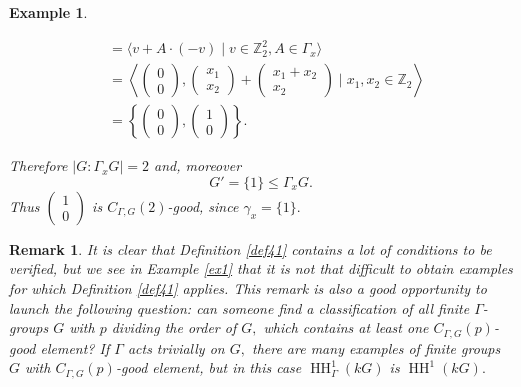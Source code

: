 \documentclass[pdflatex,sn-mathphys-num]{sn-jnl}
\numberwithin{equation}{section}
\theoremstyle{thmstyleone}
\theoremstyle{thmstyletwo}
\newtheorem{example}{Example}
\newtheorem{remark}{Remark}
\theoremstyle{thmstylethree}
\newcommand{\HH}{\operatorname{HH}}
\begin{document}
\begin{example}
\begin{itemize}
\begin{align*}
[G,\Gamma_x]
&=\langle v+A\cdot(-v)\mid v\in \mathbb{Z}_2^2,A\in \Gamma_x\rangle \\
&=\left\langle \begin{pmatrix}0 \\ 0\end{pmatrix},\begin{pmatrix}x_1 \\ x_2\end{pmatrix}+\begin{pmatrix}x_1+x_2 \\ x_2\end{pmatrix}\mid x_1,x_2\in \mathbb{Z}_2\right\rangle \\
&=\left\{\begin{pmatrix}0 \\ 0\end{pmatrix},\begin{pmatrix}1 \\ 0\end{pmatrix}\right\}.
\end{align*}

Therefore  $|G:\Gamma_x G|=2$ and, moreover $$ G'=\{1\} \leq \Gamma_x G.$$
Thus $\begin{pmatrix}1 \\ 0\end{pmatrix}$ is $C_{\Gamma,G}(2)$-good, since $\gamma_x=\{1\}.$

\end{itemize}
\end{example}
\begin{remark} It is clear that Definition \ref{def41} contains a lot of conditions to be verified, but we see in Example \ref{ex1} that it is not that difficult to obtain examples  for which Definition \ref{def41} applies. This remark is also a good opportunity to launch the following question: can someone find a classification of all finite $\Gamma$-groups $G$ with $p$ dividing the order of $G,$ which contains at least one $C_{\Gamma,G}(p)$-good element? If $\Gamma$ acts trivially on $G,$ there are many examples of finite groups $G$ with $C_{\Gamma,G}(p)$-good element, but in this case $\HH^1_{\Gamma}(kG)$ is $\HH^1(kG).$
\end{remark}
\end{document}
